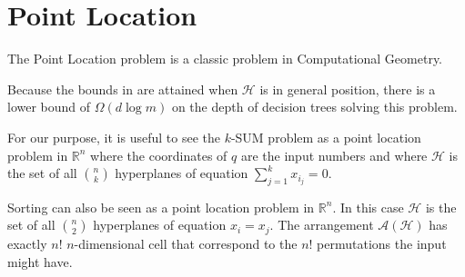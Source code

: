 \section{Point Location}

The Point Location problem is a classic problem in Computational Geometry.


Because the bounds in  are attained when \(\mathcal{H}\) is in
general position, there is a lower bound of \(\Omega(d \log m)\) on the depth
of decision trees solving this problem.

For our purpose, it is useful to see the \(k\)-SUM problem as a point location
problem in \(\mathbb{R}^n\) where the coordinates of \(q\) are the input
numbers and where \(\mathcal{H}\) is the set of all \(n \choose k\) hyperplanes
of equation \(\sum_{j=1}^{k} x_{i_j} = 0\).

Sorting can also be seen as a point location problem in \(\mathbb{R}^n\).
In this case \(\mathcal{H}\) is the set of all \(n \choose 2\) hyperplanes of
equation \(x_i = x_j\). The arrangement \(\mathcal{A}(\mathcal{H})\) has
exactly \(n!\) \(n\)-dimensional cell that correspond to the \(n!\)
permutations the input might have.

